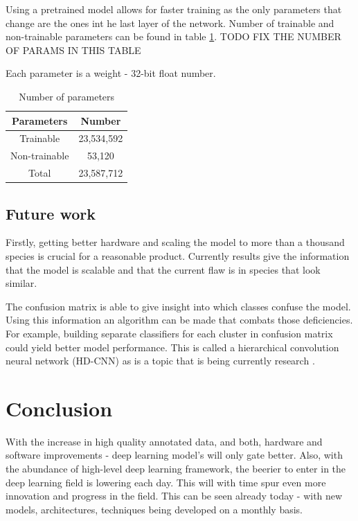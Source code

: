 \documentclass[times, utf8, diplomski]{fer}
\begin{document}
Using a pretrained model allows for faster training as the only parameters that change are the ones int he last layer of the network. Number of trainable and non-trainable parameters can be found in table \ref{tb:model_params}. TODO FIX THE NUMBER OF PARAMS IN THIS TABLE

Each parameter is a weight - 32-bit float number.

\begin{table}
\centering
\caption{Number of parameters}
\label{tb:model_params}
\begin{tabular}{cc}
\hline 
Parameters & Number \\ \hline 
Trainable &   23,534,592\\ 
Non-trainable & 53,120 \\ 
Total & 23,587,712 \\
\hline 
\end{tabular} 
\end{table}

\section{Future work}
\label{se:future_work}

Firstly, getting better hardware and scaling the model to more than a thousand species is crucial for a reasonable product. Currently results give the information that the model is scalable and that the current flaw is in species that look similar. 

The confusion matrix is able to give insight into which classes confuse the model. Using this information an algorithm can be made that combats those deficiencies. For example, building separate classifiers for each cluster in confusion matrix could yield better model performance. This is called a hierarchical convolution neural network (HD-CNN) as is a topic that is being currently research \citep{yan_hd-cnn:_2015, yan_hd-cnn:_2015-1}. 

\chapter{Conclusion}
With the increase in high quality annotated data, and both, hardware and software improvements - deep learning model's will only gate better. Also, with the abundance of high-level deep learning framework, the beerier to enter in the deep learning field is lowering each day. This  will with time spur even more innovation and progress in the field. This can be seen already today - with new models, architectures, techniques being developed on a monthly basis.
\end{document}

